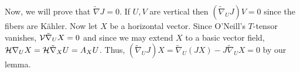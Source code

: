 \begin{myproof}

	Now, we will prove that $\tilde\nabla J=0$. If $U,V$ are vertical then $(\tilde\nabla_U J)V=0$ since the fibers are K\"ahler. Now let $X$ be a horizontal vector. Since O'Neill's $T$-tensor vanishes, $\mathcal{V}\tilde\nabla_U X=0$ and since we may extend $X$ to a basic vector field, $\mathcal{H}\nabla_U X=\mathcal{H}\tilde\nabla_X U=A_XU$. Thus, $(\tilde\nabla_UJ)X=\tilde\nabla_U(JX)-J\tilde\nabla_U X=0$ by our lemma. 
	

\end{myproof}
